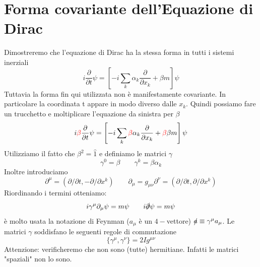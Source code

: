 \section{Forma covariante dell'Equazione di Dirac}
Dimostreremo che l'equazione di Dirac ha la stessa forma in tutti i sistemi inerziali
\begin{equation*}
    i \frac{\partial}{\partial t} \psi=\left[-i \sum_k \alpha_k \frac{\partial}{\partial x_k}+\beta m\right] \psi
\end{equation*}
Tuttavia la forma fin qui utilizzata non è manifestamente covariante. In particolare la coordinata t appare in modo diverso dalle $x_k$. Quindi possiamo fare un trucchetto e moltiplicare l'equazione da sinistra per $\beta$
\begin{equation*}
    i\textcolor{red}{\beta} \frac{\partial}{\partial t} \psi=\left[-i \sum_k \textcolor{red}{\beta}\alpha_k \frac{\partial}{\partial x_k}+\textcolor{red}{\beta}\beta m\right] \psi
\end{equation*}
Utilizziamo il fatto che $\beta^2=\hat{1}$ e definiamo le matrici $\gamma$
\begin{equation*}
    \gamma^0=\beta \qquad \gamma^k=\beta\alpha_k
\end{equation*}
Inoltre introduciamo
$$
\partial^\mu = (\partial/\partial t, -\partial/\partial x^k) \qquad \partial_\mu = g_{\mu\nu}\partial^\nu = (\partial/\partial t, \partial/\partial x^k)
$$
Riordinando i termini otteniamo:
$$
i\gamma^\mu \partial_\mu \psi = m\psi \qquad i\slashed{\partial} \psi = m\psi
$$
è molto usata la notazione di Feynman ($a_\mu$ è un $4-$vettore) $\slashed{a}\equiv\gamma^\mu a_\mu$. Le matrici $\gamma$ soddisfano le seguenti regole di commutazione
$$
\{\gamma^\mu, \gamma^\nu\} = 2Ig^{\mu\nu}
$$
Attenzione: verificheremo che non sono (tutte) hermitiane. Infatti le matrici "spaziali" non lo sono. 

